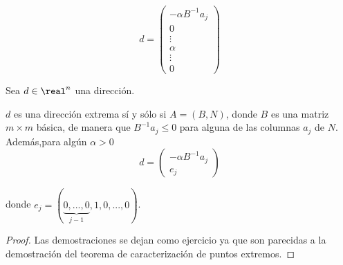 \[d = \begin{pmatrix}-αB^{-1}a_j\\\hline 0\\\vdots\\ α\\ \vdots\\0\end{pmatrix} \]


\begin{theorem}
Sea $d\in\real^n$ una dirección.

$d$ es una dirección extrema sí y sólo si $A = (B,N)$, donde $B$ es una matriz $m\times m$ básica, de manera que $B^{-1}a_j\leq 0$ para alguna de las columnas $a_j$ de $N$. Además,para algún $α>0$
\[d = \begin{pmatrix}-αB^{-1}a_j\\e_j\end{pmatrix}\]

donde $e_j = (\underbrace{0,...,0}_{j-1},1,0,...,0)$.
\end{theorem}

\begin{proof}
Las demostraciones se dejan como ejercicio ya que son parecidas a la demostración del teorema de caracterización de puntos extremos.
\end{proof}

